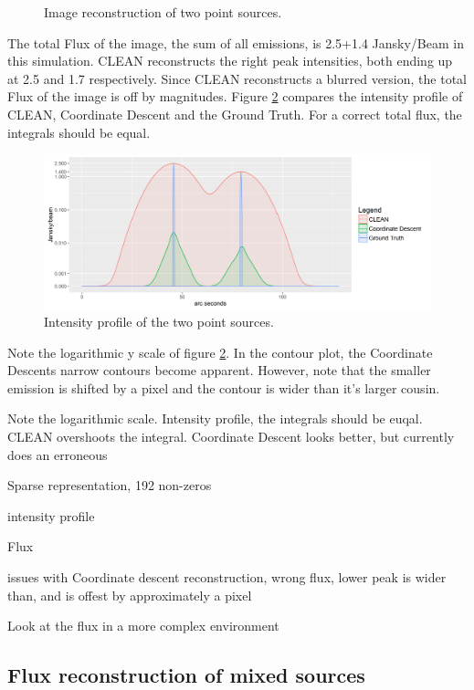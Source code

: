 \begin{figure}[h]
	\caption{Image reconstruction of two point sources.}
	\label{results:points}
\end{figure}

The total Flux of the image, the sum of all emissions, is 2.5+1.4 Jansky/Beam in this simulation. CLEAN reconstructs the right peak intensities, both ending up at 2.5 and 1.7 respectively. Since CLEAN reconstructs a blurred version, the total Flux of the image is off by magnitudes. Figure \ref{results:points:contour} compares the intensity profile of CLEAN, Coordinate Descent and the Ground Truth. For a correct total flux, the integrals should be equal.

\begin{figure}[h]
	\centering
	\includegraphics[width=0.8\linewidth]{./chapters/20.results/points/contour_points.png}
	\caption{Intensity profile of the two point sources.}
	\label{results:points:contour}
\end{figure}

Note the logarithmic y scale of figure \ref{results:points:contour}. In the contour plot, the Coordinate Descents narrow contours become apparent. However, note that the smaller emission is shifted by a pixel and the contour is wider than it's larger cousin. 

Note the logarithmic scale. Intensity profile, the integrals should be euqal. CLEAN overshoots the integral. Coordinate Descent looks better, but currently does an erroneous 

Sparse representation, 192 non-zeros

intensity profile

Flux


issues with Coordinate descent reconstruction, wrong flux, lower peak is wider than, and is offest by approximately a pixel

Look at the flux in a more complex environment


\subsection{Flux reconstruction of mixed sources}



